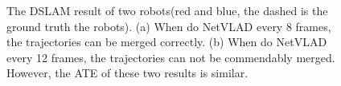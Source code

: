 \begin{figure}[thb]
    \begin{minipage}[t]{0.475\linewidth}  
    \centering
    \end{minipage}
    \begin{minipage}[t]{0.475\linewidth}  
    \centering  
    \end{minipage}
    \caption{The DSLAM result of two robots(red and blue, the dashed is the ground truth the robots). (a) When do NetVLAD every 8 frames, the trajectories can be merged correctly. (b) When do NetVLAD every 12 frames, the trajectories can not be commendably merged. However, the ATE of these two results is similar.
    }
\label{fig:dslamresult}
\end{figure}




